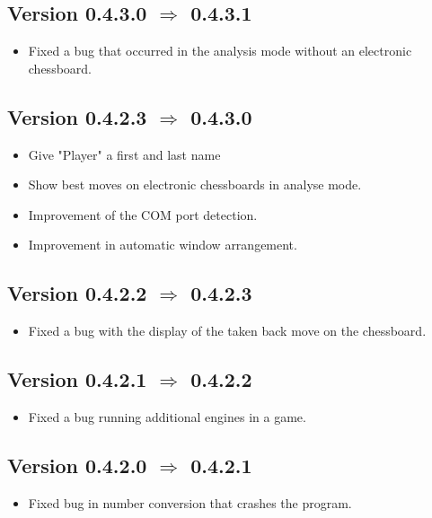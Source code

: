\documentclass[11pt,a4paper]{article}
\begin{document}
\subsection*{Version 0.4.3.0  $\Rightarrow$  0.4.3.1}
\begin{itemize}
	\item Fixed a bug that occurred in the analysis mode without an electronic chessboard.
\end{itemize}

\subsection*{Version 0.4.2.3  $\Rightarrow$  0.4.3.0}
\begin{itemize}
	\item Give "Player" a first and last name
    \item Show best moves on electronic chessboards in analyse mode.
	\item Improvement of the COM port detection.
    \item Improvement in automatic window arrangement.
\end{itemize}

\subsection*{Version 0.4.2.2  $\Rightarrow$  0.4.2.3}
\begin{itemize}
	\item Fixed a bug with the display of the taken back move on the chessboard.
\end{itemize}

\subsection*{Version 0.4.2.1  $\Rightarrow$  0.4.2.2}
\begin{itemize}
	\item Fixed a bug running additional engines in a game.	
\end{itemize}

\subsection*{Version 0.4.2.0  $\Rightarrow$  0.4.2.1}
\begin{itemize}
	\item Fixed bug in number conversion that crashes the program.
\end{itemize}
\end{document}
